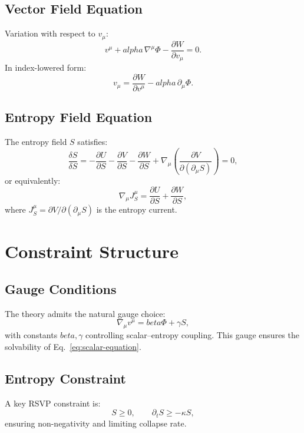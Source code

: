 \documentclass[12pt,oneside]{book}
\theoremstyle{plain}
\theoremstyle{definition}
\def\alpha{alpha}%
\def\beta{beta}%
\begin{document}
\subsection{Vector Field Equation}

Variation with respect to $v_\mu$:
\[
v^\mu + \alpha\, \nabla^\mu \Phi
- \frac{\partial W}{\partial v_\mu} = 0.
\]
In index-lowered form:
\begin{equation}
\label{eq:vector-equation}
v_\mu
=
\frac{\partial W}{\partial v^\mu}
- \alpha\, \partial_\mu \Phi.
\end{equation}

\subsection{Entropy Field Equation}

The entropy field $S$ satisfies:
\[
\frac{\delta S}{\delta S}
=
- \frac{\partial U}{\partial S}
- \frac{\partial V}{\partial S}
- \frac{\partial W}{\partial S}
+ \nabla_\mu \left( \frac{\partial V}{\partial (\partial_\mu S)} \right)
= 0,
\]
or equivalently:
\begin{equation}
\label{eq:entropy-equation}
\nabla_\mu J^\mu_S
=
\frac{\partial U}{\partial S}
+ \frac{\partial W}{\partial S},
\end{equation}
where $J^\mu_S = \partial V/\partial (\partial_\mu S)$ is the entropy current.

\section{Constraint Structure}

\subsection{Gauge Conditions}

The theory admits the natural gauge choice:
\[
\nabla_\mu v^\mu = \beta \Phi + \gamma S,
\]
with constants $\beta, \gamma$ controlling scalar--entropy coupling.
This gauge ensures the solvability of Eq.~\eqref{eq:scalar-equation}.

\subsection{Entropy Constraint}

A key RSVP constraint is:
\begin{equation}
\label{eq:entropy-constraint}
S \ge 0, \qquad
\partial_t S \ge -\kappa S,
\end{equation}
ensuring non-negativity and limiting collapse rate.
\end{document}
